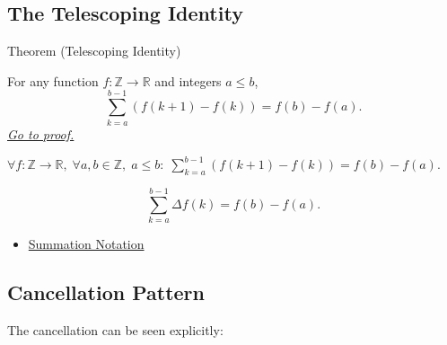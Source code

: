 
\subsection*{The Telescoping Identity}

\begin{theorembox}{Theorem (Telescoping Identity)}
\begin{theorem}
\label{thm:telescoping-identity}
For any function \(f : \mathbb{Z} \to \mathbb{R}\) and integers \(a \le b\),
\[
\sum_{k=a}^{b-1} (f(k+1) - f(k)) = f(b) - f(a).
\]
\hyperref[prf:telescoping-identity]{\textit{Go to proof.}}
\end{theorem}
\end{theorembox}

\begin{remark*}
\(\forall f : \mathbb{Z}\to\mathbb{R},\; \forall a,b \in \mathbb{Z},\; a \le b:\;
\displaystyle\sum_{k=a}^{b-1}(f(k+1)-f(k)) = f(b)-f(a)\).
\end{remark*}

\begin{remark*}
\[
\sum_{k=a}^{b-1}\Delta f(k)=f(b)-f(a).
\]
\end{remark*}

\begin{dependencies}
\begin{itemize}
  \item \hyperref[def:sigma-summation-notation]{Summation Notation}
\end{itemize}
\end{dependencies}

\subsection*{Cancellation Pattern}

\begin{exposition}
The cancellation can be seen explicitly:
\begin{center}

\end{center}
\end{exposition}


